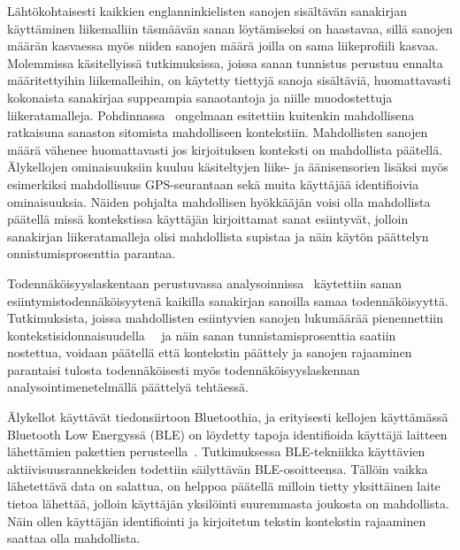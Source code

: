 \documentclass[finnish]{tktltiki2}
\theoremstyle{definition}
\theoremstyle{remark}
\begin{document}
Lähtökohtaisesti kaikkien englanninkielisten sanojen sisältävän sanakirjan käyttäminen liikemalliin täsmäävän sanan löytämiseksi on haastavaa, sillä sanojen määrän kasvaessa myös niiden sanojen määrä joilla on sama liikeprofiili kasvaa. Molemmissa käsitellyissä tutkimuksissa, joissa sanan tunnistus perustuu ennalta määritettyihin liikemalleihin, on käytetty tiettyjä sanoja sisältäviä, huomattavasti kokonaista sanakirjaa suppeampia sanaotantoja ja niille muodostettuja liikeratamalleja. Pohdinnassa~\cite{liu} ongelmaan esitettiin kuitenkin mahdollisena ratkaisuna sanaston sitomista mahdolliseen kontekstiin. Mahdollisten sanojen määrä vähenee huomattavasti jos kirjoituksen konteksti on mahdollista päätellä. Älykellojen ominaisuuksiin kuuluu käsiteltyjen liike- ja äänisensorien lisäksi myös esimerkiksi mahdollisuus GPS-seurantaan sekä muita käyttäjää identifioivia ominaisuuksia. Näiden pohjalta mahdollisen hyökkääjän voisi olla mahdollista päätellä missä kontekstissa käyttäjän kirjoittamat sanat esiintyvät, jolloin sanakirjan liikeratamalleja olisi mahdollista supistaa ja näin käytön päättelyn onnistumisprosenttia parantaa. 

Todennäköisyyslaskentaan perustuvassa analysoinnissa~\cite{mole} käytettiin sanan esiintymistodennäköisyytenä kaikilla sanakirjan sanoilla samaa todennäköisyyttä. Tutkimuksista, joissa mahdollisten esiintyvien sanojen lukumäärää pienennettiin kontekstisidonnaisuudella~\cite{liu}~\cite{mar} ja näin sanan tunnistamisprosenttia saatiin nostettua, voidaan päätellä että kontekstin päättely ja sanojen rajaaminen parantaisi tulosta todennäköisesti myös todennäköisyyslaskennan analysointimenetelmällä päättelyä tehtäessä. 

Älykellot käyttävät tiedonsiirtoon Bluetoothia, ja erityisesti kellojen käyttämässä Bluetooth Low Energyssä (BLE) on löydetty tapoja identifioida  käyttäjä laitteen lähettämien pakettien perusteella~\cite{das}. Tutkimuksessa BLE-tekniikka käyttävien aktiivisuusrannekkeiden todettiin säilyttävän BLE-osoitteensa. Tällöin vaikka lähetettävä data on salattua, on helppoa päätellä milloin tietty yksittäinen laite tietoa lähettää, jolloin käyttäjän yksilöinti suuremmasta joukosta on mahdollista. Näin ollen käyttäjän identifiointi ja kirjoitetun tekstin kontekstin rajaaminen saattaa olla mahdollista. 
\end{document}
